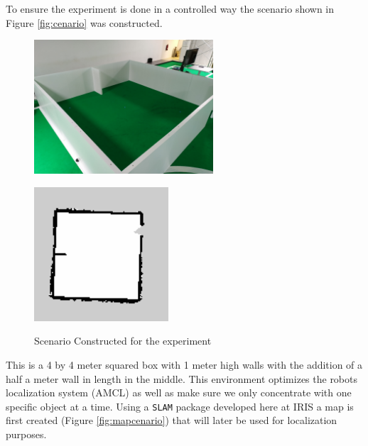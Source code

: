 To ensure the experiment is done in a controlled way the scenario shown in Figure \ref{fig:cenario} was constructed. 
\begin{figure}[ht!] 
    \begin{minipage}[t]{.49\linewidth}
        \includegraphics[height=5cm,width=\linewidth]{imgs/chapter5/mapP.jpg}
        \label{fig:cenario}
    \end{minipage}
    \begin{minipage}[t]{.49\linewidth}
        \includegraphics[height=5cm,width=\linewidth]{imgs/chapter5/map.png}
        \label{fig:mapcenario}
    \end{minipage}
    \caption{Scenario Constructed for the experiment}
    \label{fig:setup2}
\end{figure}
This is a 4 by 4 meter squared box with 1 meter high walls with the addition of a half a meter wall in length in the middle. This environment optimizes the robots localization system (\ac{AMCL}) as well as make sure we only concentrate with one specific object at a time. Using a \texttt{\ac{SLAM}} package developed here at \ac{IRIS} a map is first created (Figure \ref{fig:mapcenario}) that will later be used for localization purposes.

